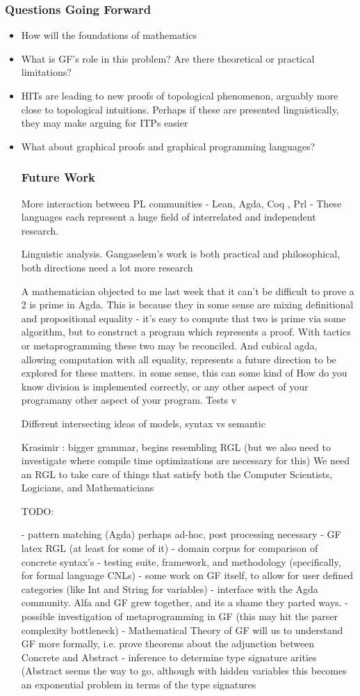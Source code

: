 \documentclass[9pt]{beamer}
\begin{document}
\begin{frame}
\frametitle{ Questions Going Forward }
\begin{itemize}
\item How will the foundations of mathematics 
\item What is GF's role in this problem? Are there theoretical or practical limitations?
\item HITs are leading to new proofs of topological phenomenon, arguably more
  close to topological intuitions. Perhaps if these are presented
  linguistically, they may make arguing for ITPs easier
\item What about graphical proofs and graphical programming languages?

\frametitle{Future Work}

More interaction between PL communities - Lean, Agda, Coq , {Prl} -
These languages each represent a  huge field of interrelated and independent research.

Linguistic analysis.  Gangaselem's work is both practical and philosophical,
both directions need a lot more research

A mathematician objected to me last week that it can't be difficult to prove a 2 is prime in
Agda. This is because they in some sense are mixing definitional and
propositional equality - it's easy to compute that two is prime via some algorithm, but to
construct a program which represents a proof. With tactics or metaprogramming
these two may be reconciled.  And cubical agda, allowing computation with all
equality, represents a future direction to be explored for these matters.
in some sense, this
can some kind of 
How do you know division is implemented correctly, or any other aspect of your
programany other aspect of your program. Tests v


Different intersecting ideas of models, syntax vs semantic

Krasimir : bigger grammar, begins resembling RGL
(but we also need to
investigate where compile time optimizations are necessary for this)
We need an RGL to take care of things that satisfy both the Computer Scientists,
Logicians, and Mathematicians

TODO:


- pattern matching (Agda) perhaps ad-hoc, post processing necessary
- GF latex RGL (at least for some of it)
- domain corpus for comparison of concrete syntax's
- testing suite, framework, and methodology (specifically, for formal language CNLs)
- some work on GF itself, to allow for user defined categories (like Int and
String for variables)
- interface with the Agda community.  Alfa and GF grew together, and its a shame
they parted ways.
- possible investigation of metaprogramming in GF (this may hit the parser
complexity bottleneck)
- Mathematical Theory of GF will us to understand GF more formally, i.e. prove
theorems about the adjunction between Concrete and Abstract
- inference to determine type signature arities (Abstract seems the way to go,
although with hidden variables this becomes an exponential problem in terms of
the type signatures


\end{itemize}
\end{frame}
\end{document}
